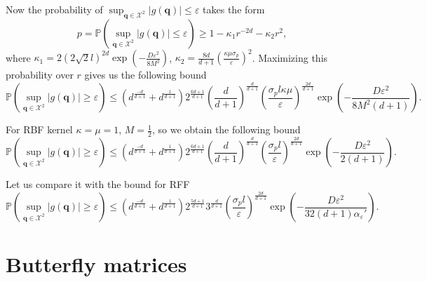 Now the probability of $\sup_{\mathbf{q} \in \mathcal{X}^2}|g(\mathbf{q})| \leq \varepsilon$ takes the form
\[
p = \mathbb{P} \left ( \sup_{\mathbf{q} \in \mathcal{X}^2}|g(\mathbf{q})| \leq \varepsilon \right ) \geq
1 - \kappa_1 r^{-2d} - \kappa_2 r^2,
\]
where $\kappa_1 = 2 \left (2\sqrt{2}l \right)^{2d}\exp \left ( -\frac{D\varepsilon^2}{8M^2} \right )$,
$\kappa_2 = \frac{8d}{d + 1}\left ( \frac{\kappa \mu \sigma_p}{\varepsilon} \right )^2$.
Maximizing this probability over $r$ gives us the following bound
\[
\mathbb{P} \left ( \sup_{\mathbf{q} \in \mathcal{X}^2}|g(\mathbf{q})| \geq \varepsilon \right ) \leq
\left (d^{\frac{-d}{d + 1}} + d^{\frac{1}{d + 1}}\right ) 2^\frac{6d + 1}{d + 1}
\left ( \frac{d}{d + 1} \right)^{\frac{d}{d + 1}}
\left ( \frac{\sigma_p l \kappa \mu}{\varepsilon} \right )^{\frac{2d}{d + 1}}
\exp \left ( -\frac{D\varepsilon^2}{8M^2(d + 1)} \right ).
\]

For RBF kernel $\kappa = \mu = 1$, $M = \frac12$, so we obtain the following bound
\[
\mathbb{P} \left ( \sup_{\mathbf{q} \in \mathcal{X}^2}|g(\mathbf{q})| \geq \varepsilon \right ) \leq
\left (d^{\frac{-d}{d + 1}} + d^{\frac{1}{d + 1}}\right ) 2^\frac{6d + 1}{d + 1}
\left ( \frac{d}{d + 1} \right)^{\frac{d}{d + 1}}
\left ( \frac{\sigma_p l}{\varepsilon} \right )^{\frac{2d}{d + 1}}
\exp \left ( -\frac{D\varepsilon^2}{2(d + 1)} \right ).
\]

Let us compare it with the bound for RFF
\[
\mathbb{P} \left ( \sup_{\mathbf{q} \in \mathcal{X}^2}|g(\mathbf{q})| \geq \varepsilon \right ) \leq
\left (d^{\frac{-d}{d + 1}} + d^{\frac{1}{d + 1}}\right )
2^\frac{5d + 1}{d + 1} 3^{\frac{d}{d + 1}}
\left ( \frac{\sigma_p l}{\varepsilon} \right )^{\frac{2d}{d + 1}}
\exp \left ( -\frac{D\varepsilon^2}{32(d + 1)\alpha_\varepsilon'} \right ).
\]



\section{Butterfly matrices}
\label{appendix:butterfly_details}

